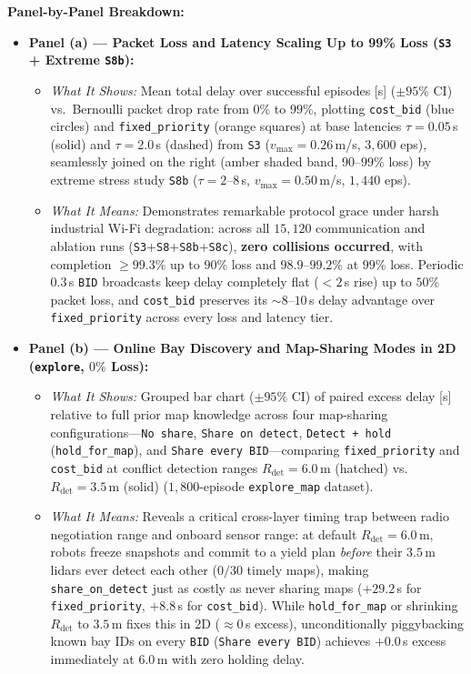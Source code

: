 \documentclass[10pt,a4paper]{article}
\begin{document}
\textbf{Panel-by-Panel Breakdown:}
\begin{itemize}
  \item \textbf{Panel (a) --- Packet Loss and Latency Scaling Up to 99\% Loss (\texttt{S3} + Extreme \texttt{S8b}):}
  \begin{itemize}
    \item \emph{What It Shows:} Mean total delay over successful episodes [s] ($\pm 95\%$ CI) vs.\ Bernoulli packet drop rate from $0\%$ to $99\%$, plotting \texttt{cost\_bid} (blue circles) and \texttt{fixed\_priority} (orange squares) at base latencies $\tau=0.05$\,s (solid) and $\tau=2.0$\,s (dashed) from \texttt{S3} ($v_{\max}=0.26$\,m/s, $3{,}600$ eps), seamlessly joined on the right (amber shaded band, $90$--$99\%$ loss) by extreme stress study \texttt{S8b} ($\tau=2$--$8$\,s, $v_{\max}=0.50$\,m/s, $1{,}440$ eps).
    \item \emph{What It Means:} Demonstrates remarkable protocol grace under harsh industrial Wi-Fi degradation: across all $15{,}120$ communication and ablation runs (\texttt{S3}+\texttt{S8}+\texttt{S8b}+\texttt{S8c}), \textbf{zero collisions occurred}, with completion $\ge 99.3\%$ up to $90\%$ loss and $98.9$--$99.2\%$ at $99\%$ loss. Periodic $0.3$\,s \texttt{BID} broadcasts keep delay completely flat ($<2$\,s rise) up to $50\%$ packet loss, and \texttt{cost\_bid} preserves its $\sim 8$--$10$\,s delay advantage over \texttt{fixed\_priority} across every loss and latency tier.
  \end{itemize}
  \item \textbf{Panel (b) --- Online Bay Discovery and Map-Sharing Modes in 2D (\texttt{explore}, $0\%$ Loss):}
  \begin{itemize}
    \item \emph{What It Shows:} Grouped bar chart ($\pm 95\%$ CI) of paired excess delay [s] relative to full prior map knowledge across four map-sharing configurations---\texttt{No share}, \texttt{Share on detect}, \texttt{Detect + hold} (\texttt{hold\_for\_map}), and \texttt{Share every BID}---comparing \texttt{fixed\_priority} and \texttt{cost\_bid} at conflict detection ranges $R_{\mathrm{det}}=6.0$\,m (hatched) vs.\ $R_{\mathrm{det}}=3.5$\,m (solid) ($1{,}800$-episode \texttt{explore\_map} dataset).
    \item \emph{What It Means:} Reveals a critical cross-layer timing trap between radio negotiation range and onboard sensor range: at default $R_{\mathrm{det}}=6.0$\,m, robots freeze snapshots and commit to a yield plan \emph{before} their $3.5$\,m lidars ever detect each other ($0/30$ timely maps), making \texttt{share\_on\_detect} just as costly as never sharing maps ($+29.2$\,s for \texttt{fixed\_priority}, $+8.8$\,s for \texttt{cost\_bid}). While \texttt{hold\_for\_map} or shrinking $R_{\mathrm{det}}$ to $3.5$\,m fixes this in 2D ($\approx 0$\,s excess), unconditionally piggybacking known bay IDs on every \texttt{BID} (\texttt{Share every BID}) achieves $+0.0$\,s excess immediately at $6.0$\,m with zero holding delay.
  \end{itemize}
\end{itemize}
\end{document}
